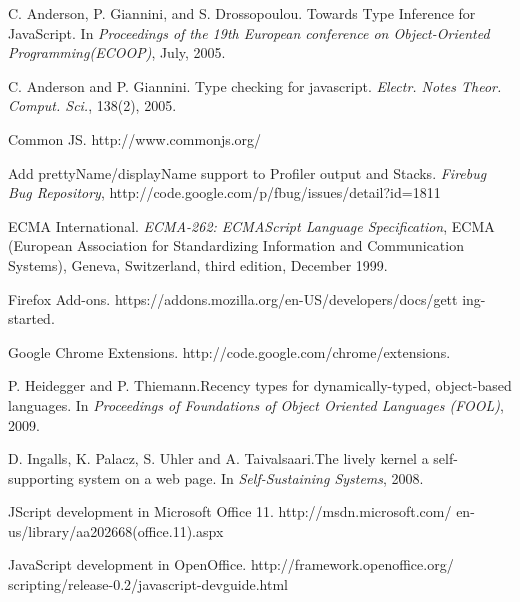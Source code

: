 \documentclass[10pt, preprint]{sigplanconf}
\begin{document}
{%


\begin{thebibliography}{}
\softraggedright


C. Anderson, P. Giannini, and S. Drossopoulou. \newblock Towards Type Inference for JavaScript.
\newblock In \emph{Proceedings of the 19th European conference on Object-Oriented Programming(ECOOP)},
July, 2005.

C. Anderson and P. Giannini. \newblock Type checking for javascript.
\newblock \emph{Electr. Notes Theor. Comput. Sci.}, 138(2), 2005. 

Common JS.
\newblock http://www.commonjs.org/

Add prettyName/displayName support to Profiler output and Stacks.
\newblock \emph{Firebug Bug Repository},
\newblock http://code.google.com/p/fbug/issues/detail?id=1811

ECMA International.
\newblock \emph{ECMA-262: ECMAScript Language Specification},
ECMA (European Association for Standardizing Information
and Communication Systems), Geneva, Switzerland, third edition,
December 1999. 

Firefox Add-ons.
\newblock https://addons.mozilla.org/en-US/developers/docs/gett ing-started.

Google Chrome Extensions.
\newblock http://code.google.com/chrome/extensions.

P. Heidegger and P. Thiemann.\newblock Recency types for dynamically-typed, object-based languages.
\newblock In \emph{Proceedings of Foundations of Object Oriented Languages (FOOL)},
2009.

D. Ingalls, K. Palacz, S. Uhler and A. Taivalsaari.\newblock The lively kernel a self-supporting system on
a web page.
\newblock In \emph{Self-Sustaining Systems},
2008.

JScript development in Microsoft Office 11.
\newblock http://msdn.microsoft.com/ en-us/library/aa202668(office.11).aspx

JavaScript development in OpenOffice.
\newblock http://framework.openoffice.org/ scripting/release-0.2/javascript-devguide.html


\end{thebibliography}}
\end{document}
